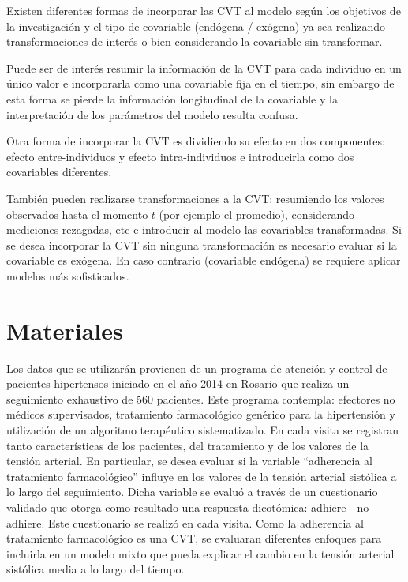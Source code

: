 \documentclass[12pt]{article}
\def\npatients{560}
\begin{document}
Existen diferentes formas de incorporar las CVT al modelo según los objetivos de la investigación y el tipo de covariable
(endógena / exógena) ya sea realizando transformaciones de interés o bien considerando la covariable sin transformar.

Puede ser de interés resumir la información de la CVT para cada individuo en un único valor e incorporarla como una covariable
fija en el tiempo, sin embargo de esta forma se pierde la información longitudinal de la covariable y la interpretación de los
parámetros del modelo resulta confusa.

Otra forma de incorporar la CVT es dividiendo su efecto en dos componentes: efecto entre-individuos y efecto intra-individuos e
introducirla como dos covariables diferentes.

También pueden realizarse transformaciones a la CVT:  resumiendo los valores observados hasta el momento $t$
(por ejemplo el promedio), considerando mediciones rezagadas, etc e introducir al modelo las covariables transformadas.
Si se desea incorporar la CVT sin ninguna transformación es necesario evaluar si la covariable es exógena. En caso contrario
(covariable endógena) se requiere aplicar modelos más sofisticados.

\newpage
\section{Materiales}

Los datos que se utilizarán provienen de un programa de atención y control de pacientes hipertensos iniciado en el año 2014
en Rosario que realiza un seguimiento exhaustivo de \npatients{} pacientes. Este programa contempla: efectores no médicos
supervisados, tratamiento farmacológico genérico para la hipertensión y utilización de un algoritmo terapéutico sistematizado.
En cada visita se registran tanto características de los pacientes, del tratamiento y de los valores de la tensión arterial.
En particular, se desea evaluar si la variable ``adherencia al tratamiento farmacológico'' influye en los valores de la tensión arterial
sistólica a lo largo del seguimiento. Dicha variable se evaluó a través de un cuestionario validado que otorga como resultado
una respuesta dicotómica: adhiere - no adhiere. Este cuestionario se realizó en cada visita. Como la adherencia al tratamiento
farmacológico es una CVT, se evaluaran diferentes enfoques para incluirla en un modelo mixto que pueda explicar el cambio
en la tensión arterial sistólica media a lo largo del tiempo.
\end{document}
